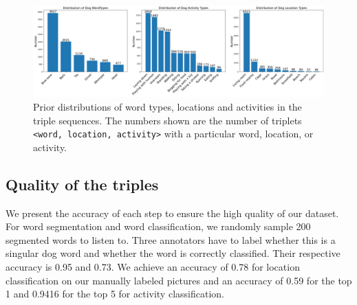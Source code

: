 \begin{figure}[ht]
\centering
\includegraphics[width=1.99\columnwidth]{images/data_distri.png}
\caption{Prior distributions of word types, locations and activities in
the triple sequences. The numbers shown are the number of triplets \texttt{<word, location, activity>}
with a particular word, location, or activity.} %
\label{fig:distri}
\end{figure}

\subsection{Quality of the triples}
We present the accuracy of each step to ensure the high quality of our dataset. For word segmentation and word classification, we randomly sample 200 segmented
words to listen to. Three annotators have to label whether this is a singular
dog word and whether the word is correctly classified. 
Their respective accuracy is 0.95 and 0.73.
We achieve an accuracy of 0.78 for location classification on our manually labeled pictures and an accuracy of 0.59 for the top 1 and 0.9416 for the top 5 for activity classification.

